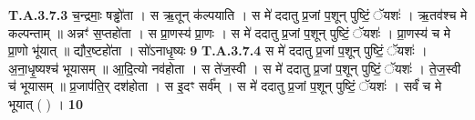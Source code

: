\documentclass[17pt]{extarticle}
\begin{document}
                                                                  \textbf{ T.A.3.7.3} \newline
                  च॒न्द्रमाः॒ षड्ढो॑ता । स ऋ॒तून् क॑ल्पयाति ।  स मे॑ ददातु प्र॒जां प॒शून् पुष्टिं॒ ॅयशः॑ । ऋ॒तव॑श्च मे कल्पन्ताम् ॥ अन्नꣳ॑ स॒प्तहो॑ता । स प्रा॒णस्य॑ प्रा॒णः । स मे॑ ददातु प्र॒जां प॒शून् पुष्टिं॒ ॅयशः॑ । प्रा॒णस्य॑ च मे प्रा॒णो भू॑यात् ॥ द्यौर॒ष्टहो॑ता । सो॑ऽनाधृ॒ष्यः \textbf{ 9} \newline
                  \newline
                                                                  \textbf{ T.A.3.7.4} \newline
                  स मे॑ ददातु प्र॒जां प॒शून् पुष्टिं॒ ॅयशः॑ । अ॒ना॒धृ॒ष्यश्च॑ भूयासम् ॥  आ॒दि॒त्यो नव॑होता । स ते॑ज॒स्वी ।  स मे॑ ददातु प्र॒जां प॒शून् पुष्टिं॒ ॅयशः॑ । ते॒ज॒स्वी च॑ भूयासम् ॥ प्र॒जाप॑ति॒र् दश॑होता । स इ॒दꣳ सर्व᳚म् । स मे॑ ददातु प्र॒जां प॒शून् पुष्टिं॒ ॅयशः॑ । सर्वं॑ च मे भूयात् ( ) । \textbf{ 10} \newline
                  \newline
                                                  
\end{document}
